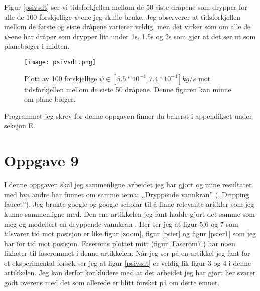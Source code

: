 \documentclass[norsk,a4paper,12pt]{article}
\begin{document}
Figur \vref{psivsdt} ser vi tidsforkjellen mellom de 50 siste dråpene som drypper for alle de 100 forskjellige $\psi$-ene jeg skulle bruke. Jeg observerer at tidsforkjellen mellom de første og siste dråpene varierer veldig, men det virker som om alle de $\psi$-ene har dråper som drypper litt under 1s, 1.5s og 2s som gjør at det ser ut som planebølger i midten.
\begin{figure}
\centering
\texttt{[image: psivsdt.png]}
\caption[$\psi$ mot tiden mellom de siste 50 dråpene]{Plott av 100 forskjellige $\psi \in [5.5*10^{-4},7.4*10^{-4}]kg/s$ mot tidsforkjellen mellom de siste 50 dråpene. Denne figuren kan minne om plane bølger.}
\label{psivsdt}
\end{figure}

Programmet jeg skrev for denne oppgaven finner du bakerst i appendikset under seksjon E.

\section{Oppgave 9}
I denne oppgaven skal jeg sammenligne arbeidet jeg har gjort og mine resultater med hva andre har funnet om samme tema: ,,Dryppende vannkran'' (,,Dripping faucet''). Jeg brukte google og google scholar til å finne relevante artikler som jeg kunne sammenligne med. Den ene artikkelen jeg fant hadde gjort det samme som meg og modellert en dryppende vannkran \citep{teori}.
Her ser jeg at figur 5,6 og 7 som tilsvarer tid mot posisjon er like figur \vref{zoom}, figur \ref{psier} og figur \vref{psier1} som jeg har for tid mot posisjon. Faseroms plottet mitt (figur \vref{Faserom7}) har noen likheter til faserommet i denne artikkelen. 
Når jeg ser på en artikkel jeg fant for et eksperimental forsøk \citep{Dreyer:1991} ser jeg at figur \vref{psivsdt} er veldig lik figur 3 og 4 i denne artikkelen. Jeg kan derfor konkludere med at det arbeidet jeg har gjort her svarer godt overens med det som allerede er blitt forsket på om dette emnet.
\newpage

\end{document}
